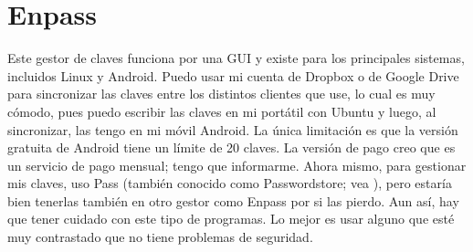 \section{Enpass}\label{sec:enpass}
Este gestor de claves funciona por una GUI y existe para los principales sistemas, incluidos Linux y Android.
Puedo usar mi cuenta de Dropbox o de Google Drive para sincronizar las claves entre los distintos clientes que
use, lo cual es muy cómodo, pues puedo escribir las claves en mi portátil con Ubuntu y luego, al sincronizar,
las tengo en mi móvil Android. La única limitación es que la versión gratuita de Android tiene un límite de 20
claves. La versión de pago creo que es un servicio de pago mensual; tengo que informarme. Ahora mismo, para
gestionar mis claves, uso Pass (también conocido como Passwordstore; vea ), pero
estaría bien tenerlas también en otro gestor como Enpass por si las pierdo. Aun así, hay que tener cuidado con
este tipo de programas. Lo mejor es usar alguno que esté muy contrastado que no tiene problemas de seguridad.

